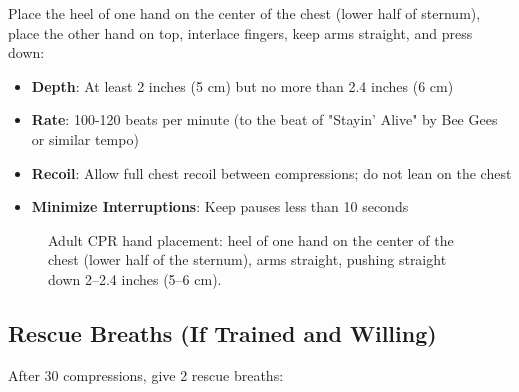 Place the heel of one hand on the center of the chest (lower half of sternum), place the other hand on top, interlace fingers, keep arms straight, and press down:

\begin{itemize}[leftmargin=*]
  \item \textbf{Depth}: At least 2 inches (5 cm) but no more than 2.4 inches (6 cm)
  \item \textbf{Rate}: 100-120 beats per minute (to the beat of "Stayin' Alive" by Bee Gees or similar tempo)
  \item \textbf{Recoil}: Allow full chest recoil between compressions; do not lean on the chest
  \item \textbf{Minimize Interruptions}: Keep pauses less than 10 seconds
\end{itemize}


\begin{figure}[h]
\centering
{}
\caption{Adult CPR hand placement: heel of one hand on the center of the chest (lower half of the sternum), arms straight, pushing straight down 2--2.4 inches (5--6 cm).}
\label{fig:cpr_hands}
\end{figure}

\subsection{Rescue Breaths (If Trained and Willing)}

After 30 compressions, give 2 rescue breaths:

